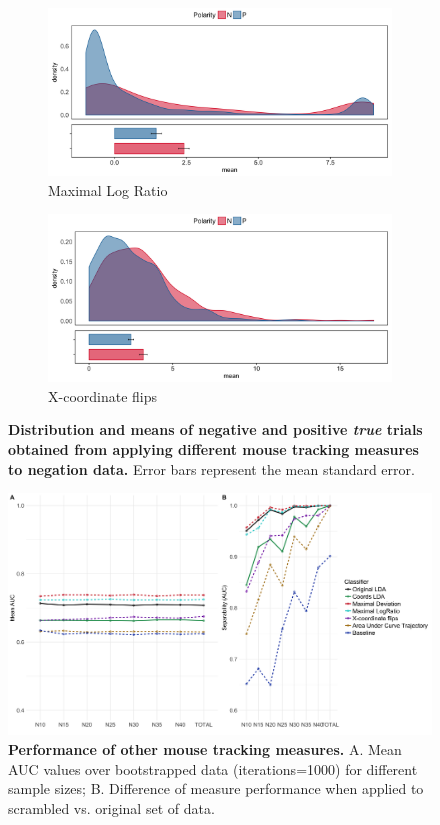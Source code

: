 \documentclass[11pt]{article}
\begin{document}
\begin{figure}
%
\begin{subfigure}[b]{0.4\textwidth}
\includegraphics[width=\textwidth]{MaxRatio_negation.png}
\caption{Maximal Log Ratio}
\end{subfigure}
%
\begin{subfigure}[b]{0.4\textwidth}
\includegraphics[width=\textwidth]{Xflips_negation.png}
\caption{X-coordinate flips}
\end{subfigure}

\caption{\textbf{Distribution and means of negative and positive \emph{true} trials obtained from applying different mouse tracking measures to negation data.} Error bars represent the mean standard error.}
\label{fig:different.measures_negation}
\end{figure}

\begin{figure}
\centering
\includegraphics[width=\textwidth]{auc_permutation_negation_2.png}
\caption{\textbf{Performance of other mouse tracking measures.} A. Mean AUC values over bootstrapped data (iterations=1000) for different sample sizes;  B. Difference of measure performance when applied to scrambled vs. original set of data.}

\label{fig:permutation_AUC_negation_measures}
\end{figure}
\end{document}
